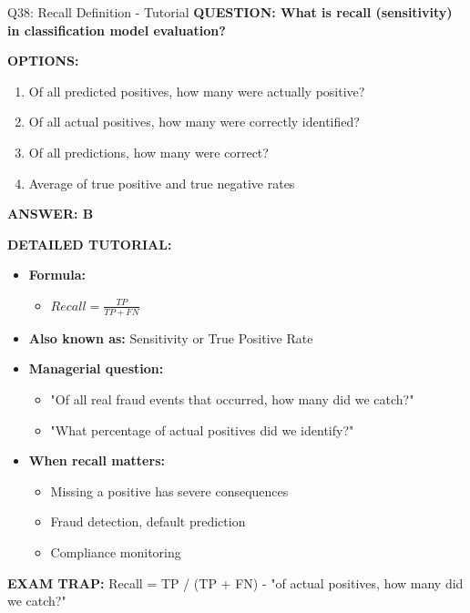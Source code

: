\documentclass[8pt]{beamer}
\begin{document}
	\begin{frame}{Q38: Recall Definition - Tutorial}
		\fontsize{6.5}{7.5}\selectfont
		\textbf{QUESTION: What is recall (sensitivity) in classification model evaluation?}
		
		\vspace{0.1cm}
		\textbf{OPTIONS:}
		\begin{enumerate}
			\item Of all predicted positives, how many were actually positive?
			\item Of all actual positives, how many were correctly identified?
			\item Of all predictions, how many were correct?
			\item Average of true positive and true negative rates
		\end{enumerate}
		
		\vspace{0.1cm}
		\textcolor{myblue}{\textbf{ANSWER: B}}
		
		\vspace{0.1cm}
		\textbf{DETAILED TUTORIAL:}
		\begin{itemize}
			\item \textbf{Formula:}
			\begin{itemize}
				\item $Recall = \frac{TP}{TP + FN}$
			\end{itemize}
			\item \textbf{Also known as:} Sensitivity or True Positive Rate
			\item \textbf{Managerial question:}
			\begin{itemize}
				\item "Of all real fraud events that occurred, how many did we catch?"
				\item "What percentage of actual positives did we identify?"
			\end{itemize}
			\item \textbf{When recall matters:}
			\begin{itemize}
				\item Missing a positive has severe consequences
				\item Fraud detection, default prediction
				\item Compliance monitoring
			\end{itemize}
		\end{itemize}
		
		\textcolor{myred}{\textbf{EXAM TRAP:}} Recall = \textcolor{myblue}{TP / (TP + FN)} - "of actual positives, how many did we catch?"
	\end{frame}
	
\end{document}
